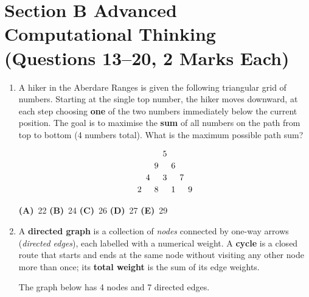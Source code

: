 \documentclass[a4paper,12pt]{article}
\newcommand{\hchoices}[5]{%
  \par\vspace{5pt}%
  \noindent\hspace{2em}%
  \textbf{(A)}~#1\hfill%
  \textbf{(B)}~#2\hfill%
  \textbf{(C)}~#3\hfill%
  \textbf{(D)}~#4\hfill%
  \textbf{(E)}~#5\par%
  \vspace{4pt}%
}
\begin{document}
\section*{Section B \quad\normalfont\large Advanced Computational Thinking
          \hfill\normalsize(Questions 13--20, 2 Marks Each)}

\begin{enumerate}[label=\textbf{Q\arabic*.},
                  itemsep=3.5ex,
                  leftmargin=3.8em,
                  parsep=0pt,
                  start=13]

\item A hiker in the Aberdare Ranges is given the following triangular grid of
numbers. Starting at the single top number, the hiker moves downward, at each
step choosing \textbf{one} of the two numbers immediately below the current
position. The goal is to maximise the \textbf{sum} of all numbers on the path
from top to bottom (4 numbers total). What is the maximum possible path sum?

\[
\begin{array}{*{7}{c@{\hspace{5pt}}}}
      &   &   & 5 &   &   &   \\[2pt]
      &   & 9 &   & 6 &   &   \\[2pt]
      & 4 &   & 3 &   & 7 &   \\[2pt]
    2 &   & 8 &   & 1 &   & 9 \\
\end{array}
\]

\hchoices{22}{24}{26}{27}{29}

\item A \textbf{directed graph} is a collection of \emph{nodes} connected by
one-way arrows (\emph{directed edges}), each labelled with a numerical weight.
A \textbf{cycle} is a closed route that starts and ends at the same node
without visiting any other node more than once; its \textbf{total weight} is
the sum of its edge weights.

The graph below has 4 nodes and 7 directed edges.

\begin{center}
\end{center}
\end{enumerate}
\end{document}
